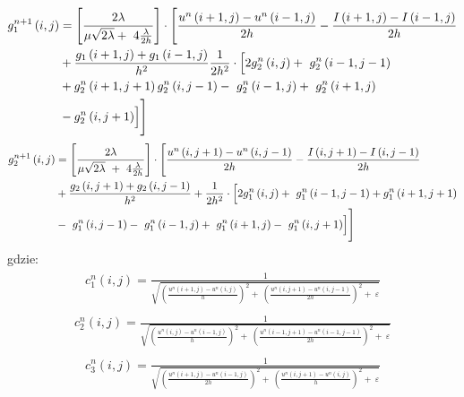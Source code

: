 \documentclass[12pt, twoside, openany]{report}
\theoremstyle{definition}
\begin{document}
\begin{align}
\begin{aligned}
g^{n+1}_1\left(i,j\right) &= \left[\frac{2\lambda }{\mu \sqrt{2\lambda }+\ 4\frac{\lambda }{2h}}\right]\cdot \Biggl[\frac{u^n\left(i+1,j\right)-u^n\left(i-1,j\right)}{2h}-\frac{I\left(i+1,j\right)-I\left(i-1,j\right)}{2h} \\
&+\frac{g_1\left(i+1,j\right)+g_1\left(i-1,j\right)}{h^2}\frac{1}{2h^2}\cdot \Bigl[2g^n_2\left(i,j\right)+\ g^n_2\left(i-1,j-1\right) \\ 
&+ g^n_2\left(i+1,j+1\right)
g^n_2\left(i,j-1\right)-\ g^n_2\left(i-1,j\right)+\ g^n_2\left(i+1,j\right) \\
&-g^n_2\left(i,j+1\right)\Bigr]\Biggr]
\end{aligned}
\end{align}
\begin{align}
\begin{aligned}
g^{n+1}_2\left(i,j\right) &=\left[\frac{2\lambda }{\mu \sqrt{2\lambda }\ +\ 4\frac{\lambda }{2h}}\right]\cdot \Biggl[\frac{u^n\left(i,j+1\right)-u^n\left(i,j-1\right)}{2h}-\frac{I\left(i,j+1\right)-I\left(i,j-1\right)}{2h} \\ 
&+\frac{g_2\left(i,j+1\right)+g_2\left(i,j-1\right)}{h^2}+\frac{1}{2h^2}\cdot \Bigl[2g^n_1\left(i,j\right)+\ g^n_1\left(i-1,j-1\right)+ g^n_1\left(i+1,j+1\right) \\
&-\ g^n_1\left(i,j-1\right)-\ g^n_1\left(i-1,j\right)+\ g^n_1\left(i+1,j\right)-\ g^n_1\left(i,j+1\right)\Bigr]\Biggr]
\end{aligned}
\end{align}
gdzie:
\begin{align}
\begin{aligned}
c^n_1\left(i,j\right)=\frac{1}{\sqrt{{\left(\frac{u^n\left(i+1,j\right)-u^n\left(i,j\right)}{h}\right)}^2+\ {\left(\frac{u^n\left(i,j+1\right)-u^n\left(i,j-1\right)}{2h}\right)}^2+\ \varepsilon }}
\end{aligned}
\end{align}
\begin{align}
\begin{aligned}
c^n_2\left(i,j\right)=\frac{1}{\sqrt{{\left(\frac{u^n\left(i,j\right)-u^n\left(i-1,j\right)}{h}\right)}^2+\ {\left(\frac{u^n\left(i-1,j+1\right)-u^n\left(i-1,j-1\right)}{2h}\right)}^2+\ \varepsilon }}
\end{aligned}
\end{align}
\begin{align}
\begin{aligned}
c^n_3\left(i,j\right)=\frac{1}{\sqrt{{\left(\frac{u^n\left(i+1,j\right)-u^n\left(i-1,j\right)}{2h}\right)}^2+\ {\left(\frac{u^n\left(i,j+1\right)-u^n\left(i,j\right)}{h}\right)}^2+\ \varepsilon }}\end{aligned}
\end{align}
\end{document}
